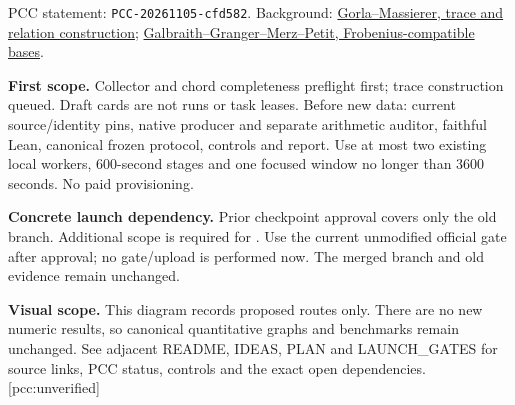 \documentclass[11pt]{article}
\begin{document}
\small PCC statement: \texttt{PCC-20261105-cfd582}. Background:
\href{https://arxiv.org/pdf/1405.1059}{Gorla--Massierer, trace and relation construction};
\href{https://sacworkshop.org/SAC20/files/preproceedings/18-IndexCalculus.pdf}{Galbraith--Granger--Merz--Petit, Frobenius-compatible bases}.
\normalsize

\textbf{First scope.} Collector and chord completeness preflight first;
trace construction queued. Draft cards are not runs or task leases. Before
new data: current source/identity pins, native producer and separate arithmetic
auditor, faithful Lean, canonical frozen protocol, controls and report.
Use at most two existing local workers, 600-second stages and one focused
window no longer than 3600 seconds. No paid provisioning.

\textbf{Concrete launch dependency.} Prior checkpoint approval covers only
the old branch. Additional scope is required for
.
Use the current unmodified official gate after approval; no gate/upload is
performed now. The merged branch and old evidence remain unchanged.

\textbf{Visual scope.} This diagram records proposed routes only. There are
no new numeric results, so canonical quantitative graphs and benchmarks remain
unchanged. See adjacent README, IDEAS, PLAN and LAUNCH\_GATES for source links,
PCC status, controls and the exact open dependencies. [pcc:unverified]
\end{document}
